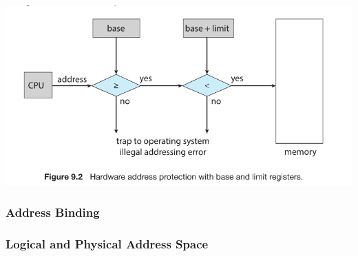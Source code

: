 \documentclass[10pt]{article}
\begin{document}
\bigbreak
\includegraphics[scale = 0.7]{Harware-protection-register.png}
\bigbreak

\subsubsection{Address Binding}

\subsubsection{Logical and Physical Address Space}
\end{document}
